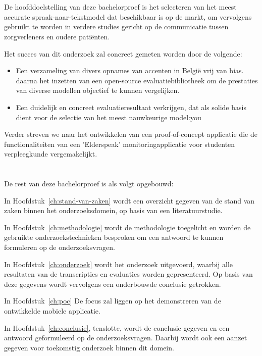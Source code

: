 \section{}%
\label{sec:onderzoeksdoelstelling}

De hoofddoelstelling van deze bachelorproef is het selecteren van het meest accurate spraak-naar-tekstmodel dat beschikbaar is op de markt, om vervolgens gebruikt te worden in verdere studies gericht op de communicatie tussen zorgverleners en oudere patiënten. 



Het succes van dit onderzoek zal concreet gemeten worden door de volgende: 

\begin{itemize}
    \item Een verzameling van divers opnames van accenten in België vrij van bias. daarna het inzetten van een open-source evaluatiebibliotheek om de prestaties van diverse modellen objectief te kunnen vergelijken. 
    \item Een duidelijk en concreet evaluatieresultaat verkrijgen, dat als solide basis dient voor de selectie van het meest nauwkeurige model:you
    

\end{itemize}

Verder streven we naar het ontwikkelen van een proof-of-concept applicatie die de functionaliteiten van een 'Elderspeak' monitoringapplicatie voor studenten verpleegkunde vergemakelijkt.

\section{}%
\label{sec:opzet-bachelorproef}


De rest van deze bachelorproef is als volgt opgebouwd:

In Hoofdstuk~\ref{ch:stand-van-zaken} wordt een overzicht gegeven van de stand van zaken binnen het onderzoeksdomein, op basis van een literatuurstudie.

In Hoofdstuk~\ref{ch:methodologie} wordt de methodologie toegelicht en worden de gebruikte onderzoekstechnieken besproken om een antwoord te kunnen formuleren op de onderzoeksvragen.

In Hoofdstuk~\ref{ch:onderzoek} wordt het onderzoek uitgevoerd, waarbij alle resultaten van de transcripties en evaluaties worden gepresenteerd. Op basis van deze gegevens wordt vervolgens een onderbouwde conclusie getrokken.

In Hoofdstuk~\ref{ch:poc} De focus zal liggen op het demonstreren van de ontwikkelde mobiele applicatie.

In Hoofdstuk~\ref{ch:conclusie}, tenslotte, wordt de conclusie gegeven en een antwoord geformuleerd op de onderzoeksvragen. Daarbij wordt ook een aanzet gegeven voor toekomstig onderzoek binnen dit domein.